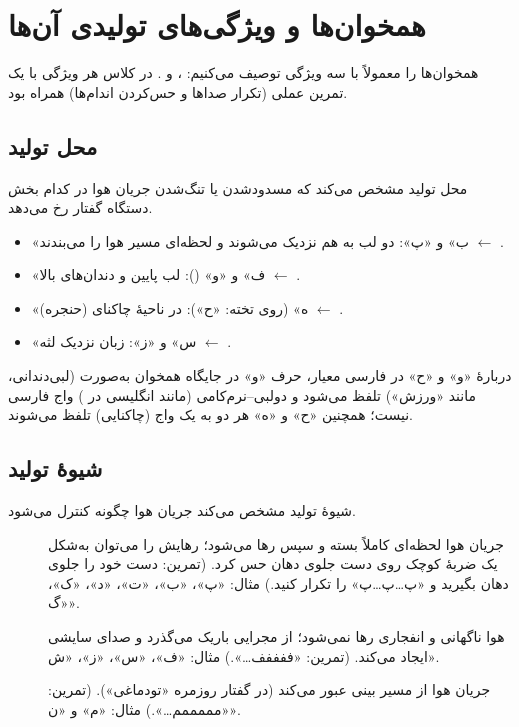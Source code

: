 \section{همخوان‌ها و ویژگی‌های تولیدی آن‌ها}

همخوان‌ها را معمولاً با سه ویژگی توصیف می‌کنیم: ،  و . در کلاس هر ویژگی با یک تمرین عملی (تکرار صداها و حس‌کردن اندام‌ها) همراه بود.

\subsection{محل تولید}
محل تولید مشخص می‌کند که مسدودشدن یا تنگ‌شدن جریان هوا در کدام بخش دستگاه گفتار رخ می‌دهد.
\begin{itemize}
  \item «ب» و «پ»: دو لب به هم نزدیک می‌شوند و لحظه‌ای مسیر هوا را می‌بندند $\leftarrow$ .
  \item «ف» و «و» (): لب پایین و دندان‌های بالا $\leftarrow$ .
  \item «ه» (روی تخته: «ح»): در ناحیهٔ چاکنای (حنجره) $\leftarrow$ .
  \item «س» و «ز»: زبان نزدیک لثه $\leftarrow$ .
\end{itemize}

\begin{correctionbox}{دربارهٔ «و» و «ح»}
در فارسی معیار، حرف «و» در جایگاه همخوان به‌صورت  (لبی‌دندانی، مانند «ورزش») تلفظ می‌شود و  دولبی–نرم‌کامی (مانند  انگلیسی در ) واج فارسی نیست؛ همچنین «ح» و «ه» هر دو به یک واج  (چاکنایی) تلفظ می‌شوند.
\end{correctionbox}

\subsection{شیوهٔ تولید}
شیوهٔ تولید مشخص می‌کند جریان هوا چگونه کنترل می‌شود.
\begin{description}
  \item[] جریان هوا لحظه‌ای کاملاً بسته و سپس رها می‌شود؛ رهایش را می‌توان به‌شکل یک ضربهٔ کوچک روی دست جلوی دهان حس کرد. (تمرین: دست خود را جلوی دهان بگیرید و «پ…پ…پ» را تکرار کنید.) مثال: «پ»، «ب»، «ت»، «د»، «ک»، «گ».
  \item[] هوا ناگهانی و انفجاری رها نمی‌شود؛ از مجرایی باریک می‌گذرد و صدای سایشی ایجاد می‌کند. (تمرین: «ففففف…».) مثال: «ف»، «س»، «ز»، «ش».
  \item[] جریان هوا از مسیر بینی عبور می‌کند (در گفتار روزمره «تودماغی»). (تمرین: «مممممم…».) مثال: «م» و «ن».
\end{description}

